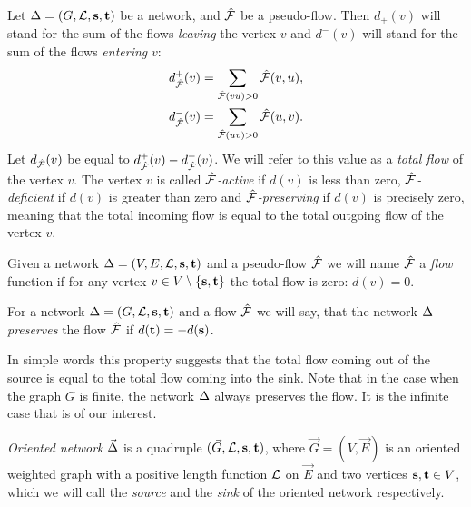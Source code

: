 \documentclass[12pt]{amsart}
\begin{document}
    \begin{definition}
      Let $\Delta = (G, \mathcal{L}, \mathbf{s}, \mathbf{t})$ be a network, and $\mathcal{\hat{F}}$ be a pseudo-flow.
      Then $d_{+}(v)$ will stand for the sum of the flows \emph{leaving} the vertex $v$ and
      $d^{-}(v)$ will stand for the sum of the flows \emph{entering} $v$:
      \begin{align*}
        &d^{+}_{\mathcal{\hat{F}}}(v) = \sum_{\mathcal{\hat{F}}(vu) > 0} \mathcal{\hat{F}}(v,u),\\
        &d^{-}_{\mathcal{\hat{F}}}(v) = \sum_{\mathcal{\hat{F}}(uv) > 0} \mathcal{\hat{F}}(u,v).
      \end{align*}
      Let $d_{\mathcal{\hat{F}}}(v)$ be equal to $d^{+}_{\mathcal{\hat{F}}}(v) - d^{-}_{\mathcal{\hat{F}}}(v)$.
      We will refer to this value as a \emph{total flow} of the vertex $v$.
      The vertex $v$ is called \emph{$\mathcal{\hat{F}}$-active} if $d(v)$ is less than zero,
        \emph{$\mathcal{\hat{F}}$-deficient} if $d(v)$ is greater than zero and
        \emph{$\mathcal{\hat{F}}$-preserving} if $d(v)$ is precisely zero, meaning that the total incoming flow
        is equal to the total outgoing flow of the vertex $v$.
    \end{definition}
    \begin{definition}
      \label{flow-dfn}
      Given a network $\Delta = (V, E, \mathcal{L}, \mathbf{s}, \mathbf{t})$ and a pseudo-flow $\mathcal{\hat{F}}$ we will name $\mathcal{\hat{F}}$ a
        \emph{flow} function if for any vertex $v \in V \setminus \{\mathbf{s}, \mathbf{t}\}$ the total flow is zero: $d(v) = 0$.
    \end{definition}
    \begin{definition}
      \label{flow-preserving-dfn}
      For a network $\Delta = (G, \mathcal{L}, \mathbf{s}, \mathbf{t})$ and a flow $\mathcal{\hat{F}}$ we will say,
      that the network $\Delta$ \emph{preserves} the flow $\mathcal{\hat{F}}$ if $d(\mathbf{t}) = -d(\mathbf{s})$.
    \end{definition}
    \begin{remark}
      In simple words this property suggests that the total flow coming out of the source is equal to the total flow
        coming into the sink.
      Note that in the case when the graph $G$ is finite, the network $\Delta$ always preserves the flow.
      It is the infinite case that is of our interest.
    \end{remark}
    \begin{definition}
      \emph{Oriented network} $\vec{\Delta}$ is a quadruple $(\vec{G}, \mathcal{L}, \mathbf{s}, \mathbf{t})$, where
        $\vec{G} = (V, \vec{E})$ is an oriented weighted graph with
        a positive length function $\mathcal{L}$ on $\vec{E}$ and two vertices $\mathbf{s}, \mathbf{t} \in V$, which
        we will call the \emph{source} and the \emph{sink} of the oriented network respectively.
    \end{definition}
\end{document}
